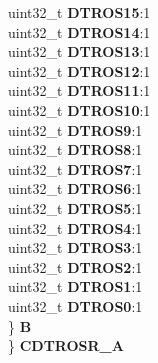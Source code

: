 \begin{DoxyCompactItemize}
\begin{tabbing}
\>\>uint32\_t {\bfseries DTROS15}:1\\
\>\>uint32\_t {\bfseries DTROS14}:1\\
\>\>uint32\_t {\bfseries DTROS13}:1\\
\>\>uint32\_t {\bfseries DTROS12}:1\\
\>\>uint32\_t {\bfseries DTROS11}:1\\
\>\>uint32\_t {\bfseries DTROS10}:1\\
\>\>uint32\_t {\bfseries DTROS9}:1\\
\>\>uint32\_t {\bfseries DTROS8}:1\\
\>\>uint32\_t {\bfseries DTROS7}:1\\
\>\>uint32\_t {\bfseries DTROS6}:1\\
\>\>uint32\_t {\bfseries DTROS5}:1\\
\>\>uint32\_t {\bfseries DTROS4}:1\\
\>\>uint32\_t {\bfseries DTROS3}:1\\
\>\>uint32\_t {\bfseries DTROS2}:1\\
\>\>uint32\_t {\bfseries DTROS1}:1\\
\>\>uint32\_t {\bfseries DTROS0}:1\\
\>\} {\bfseries B}\\
\} {\bfseries CDTROSR\_A}\\


\end{tabbing}
\end{DoxyCompactItemize}
